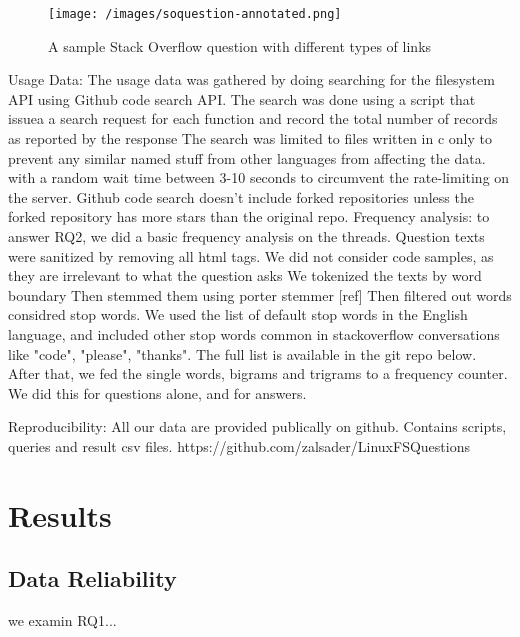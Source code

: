 \begin{figure}[t!]
  \texttt{[image: /images/soquestion-annotated.png]}
  \caption{A sample Stack Overflow question with different types of links}
  \label{fig:soq}
\end{figure}

Usage Data: The usage data was gathered by doing searching for the filesystem API using Github code search API. The search was done using a script that issuea a search request for each function and record the total number of records as reported by the response The search was limited to files written in c only to prevent any similar named stuff from other languages from affecting the data.
with a random wait time between 3-10 seconds to circumvent the rate-limiting on the server.
Github code search doesn't include forked repositories unless the forked repository has more stars than the original repo.
Frequency analysis: to answer RQ2, we did a basic frequency analysis on the threads.
Question texts were sanitized by removing all html tags.
We did not consider code samples, as they are irrelevant to what the question asks
We tokenized the texts by word boundary
Then stemmed them using porter stemmer [ref]
Then filtered out words considred stop words. We used the list of default stop words in the English language, and included other stop words common in stackoverflow conversations like "code", "please", "thanks". The full list is available in the git repo below.
After that, we fed the single words, bigrams and trigrams to a frequency counter.
We did this for questions alone, and for answers.

Reproducibility:
All our data are provided publically on github. Contains scripts, queries and result csv files.
https://github.com/zalsader/LinuxFSQuestions

\section{Results}
\subsection{Data Reliability}
we examin RQ1...
